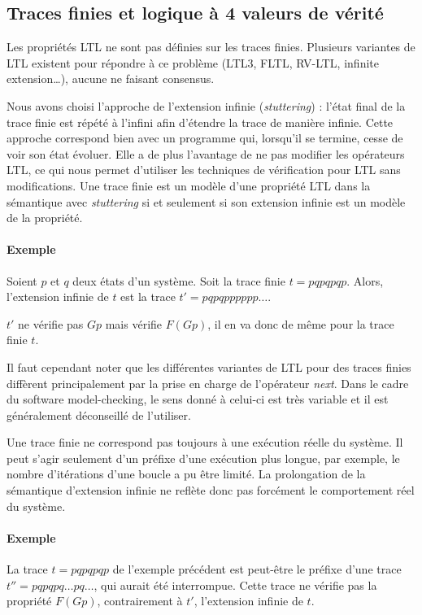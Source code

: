 \subsection{Traces finies et logique à 4 valeurs de vérité}

Les propriétés \ac{LTL} ne sont pas définies sur les traces finies. Plusieurs
variantes de \ac{LTL} existent pour répondre à ce problème (LTL3, FLTL, RV-LTL,
infinite extension\ldots{}), aucune ne faisant consensus.

Nous avons choisi l'approche de l'extension infinie (\emph{stuttering}) : l'état final de la
trace finie est répété à l'infini afin d'étendre la trace de manière
infinie. Cette approche correspond bien avec un programme qui, lorsqu'il
se termine, cesse de voir son état évoluer. Elle a de plus
l'avantage de ne pas modifier les opérateurs \ac{LTL}, ce qui nous permet
d'utiliser les techniques de vérification pour \ac{LTL} sans modifications.
Une trace finie est un modèle d'une propriété \ac{LTL} dans la sémantique
avec \emph{stuttering} si et seulement si son extension infinie est un
modèle de la propriété.

\paragraph{Exemple}
Soient \(p\) et \(q\) deux états d'un système. Soit la trace finie \(t =
pqpqpqp\). Alors, l'extension infinie de \(t\) est la trace \(t' =
pqpqpppppp\dots\).

\(t'\) ne vérifie pas \(G p\) mais vérifie \(F(G p)\), il en va donc de même
pour la trace finie \(t\).

Il faut cependant noter que les différentes variantes de \ac{LTL} pour des
traces finies diffèrent principalement par la prise en charge de
l'opérateur \emph{next}. Dans le cadre du software model-checking, le
sens donné à celui-ci est très variable et il est généralement
déconseillé de l'utiliser.

Une trace finie ne correspond pas toujours à une exécution réelle du système.
Il peut s'agir seulement d'un préfixe d'une exécution plus longue, par exemple,
le nombre d'itérations d'une boucle a pu être limité. La prolongation de la
sémantique d'extension infinie ne reflète donc pas forcément le comportement
réel du système.

\paragraph{Exemple}
La trace \(t = pqpqpqp\) de l'exemple précédent est peut-être le préfixe d'une
trace \(t'' = pqpqpq\dots pq\dots\), qui aurait été interrompue. Cette trace ne
vérifie pas la propriété \(F (G p)\), contrairement à \(t'\), l'extension infinie de \(t\).

